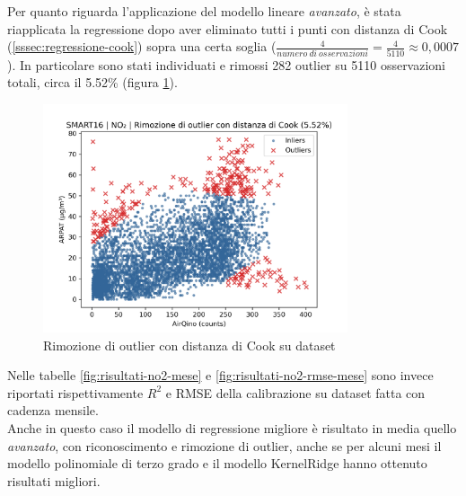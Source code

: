 Per quanto riguarda l'applicazione del modello lineare \textit{avanzato}, è stata riapplicata la regressione dopo aver eliminato tutti i punti con distanza di Cook (\ref{sssec:regressione-cook}) sopra una certa soglia ($\frac{4}{numero\ di\ osservazioni} = \frac{4}{5110} \approx 0,0007$). In particolare sono stati individuati e rimossi 282 outlier su 5110 osservazioni totali, circa il 5.52\% (figura \ref{fig:cook-no2}).

\begin{figure}[H]
\centering
\includegraphics[width=0.80\textwidth,height=\textheight,keepaspectratio]{img/cook_no2.png}
\caption{Rimozione di outlier con distanza di Cook su dataset }%
\label{fig:cook-no2}%
\end{figure}

Nelle tabelle \ref{fig:risultati-no2-mese} e \ref{fig:risultati-no2-rmse-mese} sono invece riportati rispettivamente $R^2$ e RMSE della calibrazione su dataset  fatta con cadenza mensile.\\

Anche in questo caso il modello di regressione migliore è risultato in media quello \textit{avanzato}, con riconoscimento e rimozione di outlier, anche se per alcuni mesi il modello polinomiale di terzo grado e il modello KernelRidge hanno ottenuto risultati migliori.

